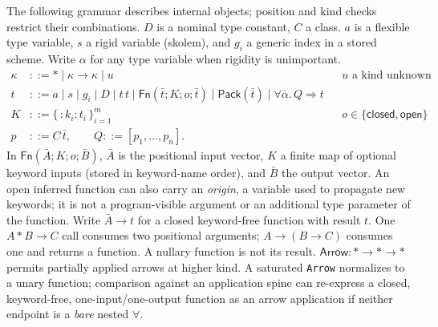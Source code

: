 \documentclass[11pt]{article}
\theoremstyle{definition}
\newcommand{\code}[1]{\texttt{#1}}
\newcommand{\Fn}{\mathsf{Fn}}
\newcommand{\Pack}{\mathsf{Pack}}
\newcommand{\arr}{\mathbin{\to}}
\begin{document}
The following grammar describes internal objects; position and kind checks
restrict their combinations. $D$ is a nominal type constant, $C$ a class.
$a$ is a flexible type variable, $s$ a rigid variable (skolem), and $g_i$ a
generic index in a stored scheme. Write $\alpha$ for any type variable when
rigidity is unimportant.
\[
\begin{aligned}
 \kappa &::= * \mid \kappa\arr\kappa \mid u
                       && u\text{ a kind unknown}\\
 t &::= a \mid s \mid g_i \mid D \mid t\,t
        \mid \Fn(\bar t;K;o;\bar t)
        \mid \Pack(\bar t) \mid \forall\bar\alpha.\,Q\Rightarrow t\\
 K &::= \{\,{:}k_i:t_i\,\}_{i=1}^m
          && o\in\{\mathsf{closed},\mathsf{open}\}\\
 p &::= C\,\bar t,\qquad Q ::= [p_1,\dots,p_n].
\end{aligned}
\]
In $\Fn(\bar A;K;o;\bar B)$, $\bar A$ is the positional input vector,
$K$ a finite map of optional keyword inputs (stored in keyword-name order),
and $\bar B$ the output vector. An open inferred function can also carry an
\emph{origin}, a variable used to propagate new keywords; it is not a
program-visible argument or an additional type parameter of the function.
Write $\bar A\arr t$ for a closed keyword-free function with result $t$.
One $A * B \arr C$ call consumes two positional arguments;
$A\arr(B\arr C)$ consumes one and returns a function. A nullary function
is not its result. $\mathsf{Arrow}:*\arr *\arr *$ permits partially applied
arrows at higher kind. A saturated \code{Arrow} normalizes to a unary
function; comparison against an application spine can re-express a closed,
keyword-free, one-input/one-output function as an arrow application if neither
endpoint is a \emph{bare} nested $\forall$.
\end{document}
